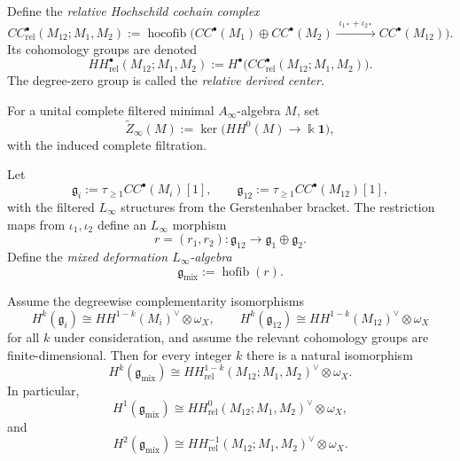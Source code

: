 \begin{definition}
\label{def:relative-hochschild-cochains}
Define the \emph{relative Hochschild cochain complex}
\[
CC^\bullet_{\mathrm{rel}}(M_{12};M_1,M_2)
:=
\operatorname{hocofib}\!\Big(
CC^\bullet(M_1)\oplus CC^\bullet(M_2)
\xrightarrow{\;\iota_{1*}+\iota_{2*}\;}
CC^\bullet(M_{12})
\Big).
\]
Its cohomology groups are denoted
\[
HH^\bullet_{\mathrm{rel}}(M_{12};M_1,M_2)
:= H^\bullet\big(CC^\bullet_{\mathrm{rel}}(M_{12};M_1,M_2)\big).
\]
The degree-zero group is called the \emph{relative derived center}.
\end{definition}

\begin{definition}
\label{def:complete-reduced-derived-center}
For a unital complete filtered minimal \(A_\infty\)-algebra \(M\), set
\[
\widetilde Z_\infty(M)
:=
\ker\bigl(HH^0(M)\longrightarrow \Bbbk\mathbf 1\bigr),
\]
with the induced complete filtration.
\end{definition}

\begin{definition}
\label{def:mixed-deformation-linfty-relative}
Let
\[
\mathfrak g_i:=\tau_{\ge 1}CC^\bullet(M_i)[1],
\qquad
\mathfrak g_{12}:=\tau_{\ge 1}CC^\bullet(M_{12})[1],
\]
with the filtered $L_\infty$ structures from the Gerstenhaber bracket. The restriction maps from $\iota_1,\iota_2$ define an $L_\infty$ morphism
\[
r=(r_1,r_2):\mathfrak g_{12}\to \mathfrak g_1\oplus \mathfrak g_2.
\]
Define the \emph{mixed deformation $L_\infty$-algebra}
\[
\mathfrak g_{\mathrm{mix}}:=\operatorname{hofib}(r).
\]
\end{definition}

\begin{theorem}
\label{thm:relative-duality-theorem}
Assume the degreewise complementarity isomorphisms
\[
H^k(\mathfrak g_i)
\cong
HH^{1-k}(M_i)^\vee\otimes \omega_X,
\qquad
H^k(\mathfrak g_{12})
\cong
HH^{1-k}(M_{12})^\vee\otimes \omega_X
\]
for all $k$ under consideration, and assume the relevant cohomology groups are finite-dimensional. Then for every integer $k$ there is a natural isomorphism
\[
H^k(\mathfrak g_{\mathrm{mix}})
\cong
HH^{1-k}_{\mathrm{rel}}(M_{12};M_1,M_2)^\vee\otimes \omega_X.
\]
In particular,
\[
H^1(\mathfrak g_{\mathrm{mix}})
\cong
HH^{0}_{\mathrm{rel}}(M_{12};M_1,M_2)^\vee\otimes \omega_X,
\]
and
\[
H^2(\mathfrak g_{\mathrm{mix}})
\cong
HH^{-1}_{\mathrm{rel}}(M_{12};M_1,M_2)^\vee\otimes \omega_X.
\]
\end{theorem}

